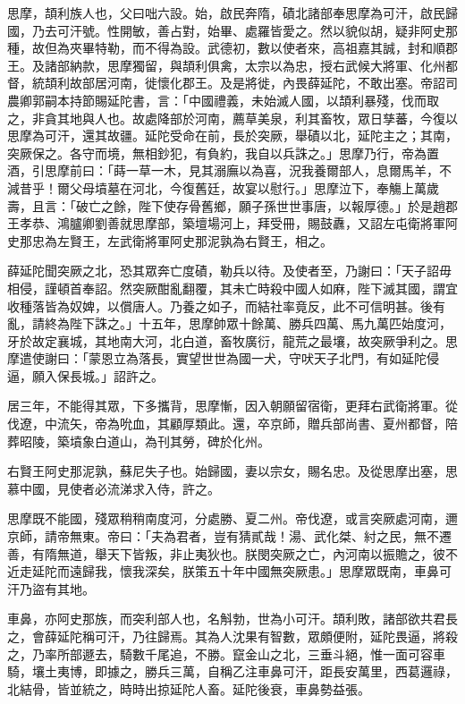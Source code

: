\begin{pinyinscope}
 思摩，頡利族人也，父曰咄六設。始，啟民奔隋，磧北諸部奉思摩為可汗，啟民歸國，乃去可汗號。性開敏，善占對，始畢、處羅皆愛之。然以貌似胡，疑非阿史那種，故但為夾畢特勒，而不得為設。武德初，數以使者來，高祖嘉其誠，封和順郡王。及諸部納款，思摩獨留，與頡利俱禽，太宗以為忠，授右武候大將軍、化州都督，統頡利故部居河南，徙懷化郡王。及是將徙，內畏薛延陀，不敢出塞。帝詔司農卿郭嗣本持節賜延陀書，言：「中國禮義，未始滅人國，以頡利暴殘，伐而取之，非貪其地與人也。故處降部於河南，薦草美泉，利其畜牧，眾日孳蕃，今復以思摩為可汗，還其故疆。延陀受命在前，長於突厥，舉磧以北，延陀主之；其南，突厥保之。各守而境，無相鈔犯，有負約，我自以兵誅之。」思摩乃行，帝為置酒，引思摩前曰：「蒔一草一木，見其溺廡以為喜，況我養爾部人，息爾馬羊，不減昔乎！爾父母墳墓在河北，今復舊廷，故宴以慰行。」思摩泣下，奉觴上萬歲壽，且言：「破亡之餘，陛下使存骨舊鄉，願子孫世世事唐，以報厚德。」於是趙郡王孝恭、鴻臚卿劉善就思摩部，築壇場河上，拜受冊，賜鼓纛，又詔左屯衛將軍阿史那忠為左賢王，左武衛將軍阿史那泥孰為右賢王，相之。



 薛延陀聞突厥之北，恐其眾奔亡度磧，勒兵以待。及使者至，乃謝曰：「天子詔毋相侵，謹頓首奉詔。然突厥酣亂翻覆，其未亡時殺中國人如麻，陛下滅其國，謂宜收種落皆為奴婢，以償唐人。乃養之如子，而結社率竟反，此不可信明甚。後有亂，請終為陛下誅之。」十五年，思摩帥眾十餘萬、勝兵四萬、馬九萬匹始度河，牙於故定襄城，其地南大河，北白道，畜牧廣衍，龍荒之最壤，故突厥爭利之。思摩遣使謝曰：「蒙恩立為落長，實望世世為國一犬，守吠天子北門，有如延陀侵逼，願入保長城。」詔許之。



 居三年，不能得其眾，下多攜背，思摩慚，因入朝願留宿衛，更拜右武衛將軍。從伐遼，中流矢，帝為吮血，其顧厚類此。還，卒京師，贈兵部尚書、夏州都督，陪葬昭陵，築墳象白道山，為刊其勞，碑於化州。



 右賢王阿史那泥孰，蘇尼失子也。始歸國，妻以宗女，賜名忠。及從思摩出塞，思慕中國，見使者必流涕求入侍，許之。



 思摩既不能國，殘眾稍稍南度河，分處勝、夏二州。帝伐遼，或言突厥處河南，邇京師，請帝無東。帝曰：「夫為君者，豈有猜貳哉！湯、武化桀、紂之民，無不遷善，有隋無道，舉天下皆叛，非止夷狄也。朕閔突厥之亡，內河南以振贍之，彼不近走延陀而遠歸我，懷我深矣，朕策五十年中國無突厥患。」思摩眾既南，車鼻可汗乃盜有其地。



 車鼻，亦阿史那族，而突利部人也，名斛勃，世為小可汗。頡利敗，諸部欲共君長之，會薛延陀稱可汗，乃往歸焉。其為人沈果有智數，眾頗便附，延陀畏逼，將殺之，乃率所部遯去，騎數千尾追，不勝。竄金山之北，三垂斗絕，惟一面可容車騎，壤土夷博，即據之，勝兵三萬，自稱乙注車鼻可汗，距長安萬里，西葛邏祿，北結骨，皆並統之，時時出掠延陀人畜。延陀後衰，車鼻勢益張。




\end{pinyinscope}
